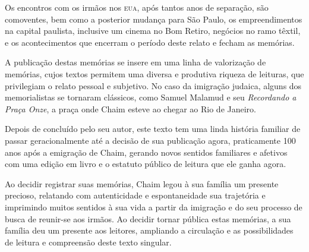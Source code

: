 Os encontros com os irmãos nos \textsc{eua}, após tantos anos de
separação, são comoventes, bem como a posterior mudança para São Paulo,
os empreendimentos na capital paulista, inclusive um cinema no Bom
Retiro, negócios no ramo têxtil, e os acontecimentos que encerram o
período deste relato e fecham as memórias.

A publicação destas memórias se insere em uma linha de valorização de
memórias, cujos textos permitem uma diversa e produtiva riqueza de
leituras, que privilegiam o relato pessoal e subjetivo. No caso da
imigração judaica, alguns dos memorialistas se tornaram clássicos, como
Samuel Malamud e seu \textit{Recordando a Praça Onze}, a praça onde Chaim esteve ao chegar
ao Rio de Janeiro.

Depois de concluído pelo seu autor, este texto tem uma linda história
familiar de passar geracionalmente até a decisão de sua publicação
agora, praticamente 100 anos após a emigração de Chaim, gerando novos
sentidos familiares e afetivos com uma edição em livro e o estatuto
público de leitura que ele ganha agora.

Ao decidir registrar suas memórias, Chaim legou à sua família um
presente precioso, relatando com autenticidade e espontaneidade sua
trajetória e imprimindo muitos sentidos à sua vida a partir da imigração
e do seu processo de busca de reunir-se aos irmãos. Ao decidir tornar
pública estas memórias, a sua família deu um presente aos leitores,
ampliando a circulação e as possibilidades de leitura e compreensão
deste texto singular.